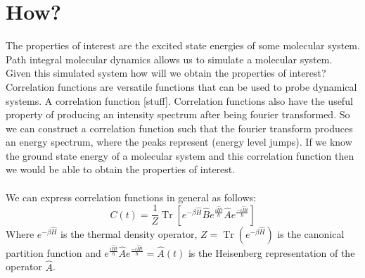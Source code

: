\documentclass[12pt,letterpaper,oneside,final,titlepage]{article}               %
\numberwithin{equation}{section} %
\newcommand{\eBH}{e^{-\beta\hat{H}}}
\newcommand{\emiHt}{e^{\frac{-i\hat{H}t}{\hbar}}}
\newcommand{\eiHt}{e^{\frac{i\hat{H}t}{\hbar}}}
\DeclareMathOperator{\Tr}{Tr}
\begin{document}
\newpage

\section{How?}
The properties of interest are the excited state energies of some molecular system. 
Path integral molecular dynamics allows us to simulate a molecular system. 
Given this simulated system how will we obtain the properties of interest?
Correlation functions are versatile functions that can be used to probe dynamical systems.
A correlation function [stuff].
Correlation functions also have the useful property of producing an intensity spectrum after being fourier transformed.
So we can construct a correlation function such that the fourier transform produces an energy spectrum, where the peaks
represent (energy level jumps).
If we know the ground state energy of a molecular system and this correlation function then we would be able to obtain the properties of interest. \\ \\
We can express correlation functions in general as follows:
\begin{equation}
    C(t) = \frac{1}{Z}\Tr[\eBH\hat{B}\eiHt\hat{A}\emiHt]
\end{equation}
Where $\eBH$ is the thermal density operator, $Z = \Tr(\eBH)$ is the canonical partition function 
and $\eiHt\hat{A}\emiHt=\hat{A}(t)$ is the Heisenberg representation of the operator $\hat{A}$.
\end{document}
